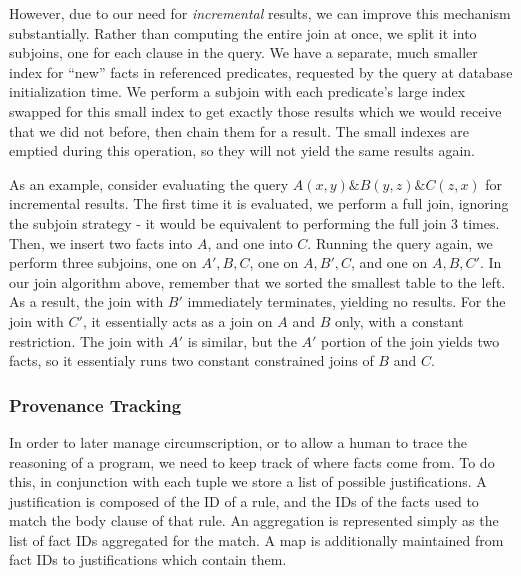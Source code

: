 However, due to our need for \emph{incremental} results, we can improve this mechanism substantially.
Rather than computing the entire join at once, we split it into subjoins, one for each clause in the query.
We have a separate, much smaller index for ``new'' facts in referenced predicates, requested by the query at database initialization time.
We perform a subjoin with each predicate's large index swapped for this small index to get exactly those results which we would receive that we did not before, then chain them for a result.
The small indexes are emptied during this operation, so they will not yield the same results again.

As an example, consider evaluating the query $A(x, y) \& B(y, z) \& C(z, x)$ for incremental results.
The first time it is evaluated, we perform a full join, ignoring the subjoin strategy - it would be equivalent to performing the full join 3 times.
Then, we insert two facts into $A$, and one into $C$.
Running the query again, we perform three subjoins, one on $A', B, C$, one on $A, B', C$, and one on $A, B, C'$.
In our join algorithm above, remember that we sorted the smallest table to the left.
As a result, the join with $B'$ immediately terminates, yielding no results.
For the join with $C'$, it essentially acts as a join on $A$ and $B$ only, with a constant restriction.
The join with $A'$ is similar, but the $A'$ portion of the join yields two facts, so it essentialy runs two constant constrained joins of $B$ and $C$.

\subsubsection{Provenance Tracking}
In order to later manage circumscription, or to allow a human to trace the reasoning of a program, we need to keep track of where facts come from.
To do this, in conjunction with each tuple we store a list of possible justifications.
A justification is composed of the ID of a rule, and the IDs of the facts used to match the body clause of that rule.
An aggregation is represented simply as the list of fact IDs aggregated for the match.
A map is additionally maintained from fact IDs to justifications which contain them.

